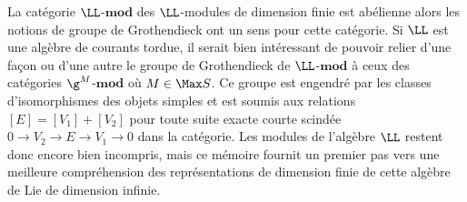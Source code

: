 La catégorie $\LL$-$\mathbf{mod}$ des $\LL$-modules de dimension finie est abélienne alors les notions de groupe de Grothendieck ont un sens pour cette catégorie. Si $\LL$ est une algèbre de courants tordue, il serait bien intéressant de pouvoir relier d'une façon ou d'une autre le groupe de Grothendieck de $\LL$-$\mathbf{mod}$ à ceux des catégories $\g^M$-$\mathbf{mod}$ où $M \in \Max S$. Ce groupe est engendré par les classes d'isomorphismes des objets simples et est soumis aux relations $[E] = [V_1]+[V_2]$ pour toute suite exacte courte scindée $0 \rightarrow V_2 \rightarrow E \rightarrow V_1 \rightarrow 0$ dans la catégorie. Les modules de l'algèbre $\LL$ restent donc encore bien incompris, mais ce mémoire fournit un premier pas vers une meilleure compréhension des représentations de dimension finie de cette algèbre de Lie de dimension infinie.


